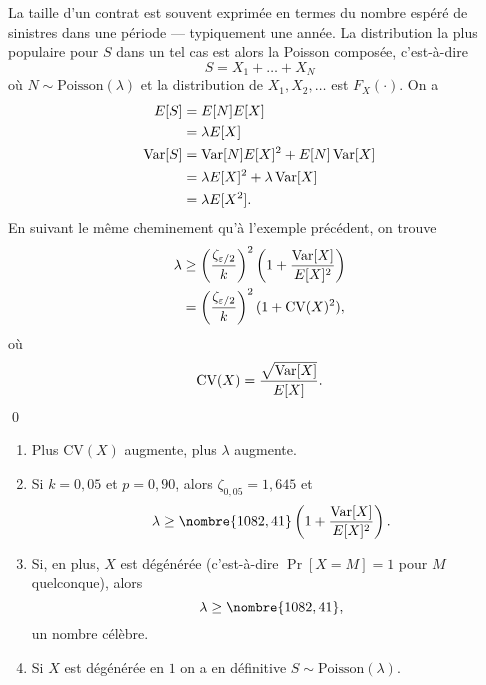 \begin{exemple}
  La taille d'un contrat est souvent exprimée en termes du nombre
  espéré de sinistres dans une période --- typiquement une année. La
  distribution la plus populaire pour $S$ dans un tel cas est alors la
  Poisson composée, c'est-à-dire
  \begin{displaymath}
    S = X_1 + \dots + X_N
  \end{displaymath}
  où $N \sim \text{Poisson}(\lambda)$ et la distribution de $X_1, X_2,
  \dots$ est $F_X(\cdot)$. On a
  \begin{align*}
    E [ S ]
    &= E [ N ] E [ X ] \\
    &= \lambda E [ X ] \\
    \operatorname{Var} [ S ]
    &= \operatorname{Var} [ N ] E [ X ]^2 + E [ N ] \operatorname{Var} [ X ] \\
    &= \lambda E [ X ]^2 + \lambda \operatorname{Var} [ X ] \\
    &= \lambda E [ X^2 ].
  \end{align*}
  En suivant le même cheminement qu'à l'exemple précédent, on trouve
  \begin{align*}
    \lambda
    &\geq
    \left(
      \frac{\zeta_{\varepsilon/2}}{k}
    \right)^2
    \left(
      1 + \frac{\operatorname{Var} [ X ]}{E [ X ]^2}
    \right) \\
    &=
    \left(
      \frac{\zeta_{\varepsilon/2}}{k}
    \right)^2
    (1 + \text{CV}(X)^2),
  \end{align*}
  où
  \begin{displaymath}
    \text{CV}(X) = \frac{\sqrt{\operatorname{Var} [ X ]}}{E [ X ]}.
  \end{displaymath}
  \qed
\end{exemple}

\begin{rems}
  \begin{enumerate}
  \item Plus $\text{CV}(X)$ augmente, plus $\lambda$ augmente.
  \item Si $k = 0,05$ et $p = 0,90$, alors $\zeta_{0,05} = 1,645$ et
    \begin{displaymath}
      \lambda
      \geq
      \nombre{1082,41}
      \left(
        1 + \frac{\var{X}}{\esp{X}^2}
      \right).
    \end{displaymath}
  \item Si, en plus, $X$ est dégénérée (c'est-à-dire $\Pr[X = M] = 1$
    pour $M$ quelconque), alors
    \begin{displaymath}
      \lambda \geq \nombre{1082,41},
    \end{displaymath}
    un nombre célèbre.
  \item Si $X$ est dégénérée en $1$ on a en définitive $S \sim
    \text{Poisson}(\lambda)$.
  \end{enumerate}
\end{rems}

